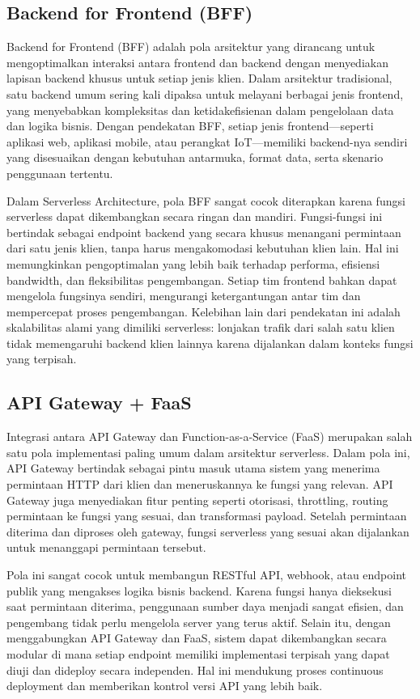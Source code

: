 \subsection{Backend for Frontend (BFF)}

Backend for Frontend (BFF) adalah pola arsitektur yang dirancang untuk mengoptimalkan interaksi antara frontend dan backend dengan menyediakan lapisan backend khusus untuk setiap jenis klien. Dalam arsitektur tradisional, satu backend umum sering kali dipaksa untuk melayani berbagai jenis frontend, yang menyebabkan kompleksitas dan ketidakefisienan dalam pengelolaan data dan logika bisnis. Dengan pendekatan BFF, setiap jenis frontend—seperti aplikasi web, aplikasi mobile, atau perangkat IoT—memiliki backend-nya sendiri yang disesuaikan dengan kebutuhan antarmuka, format data, serta skenario penggunaan tertentu.

Dalam Serverless Architecture, pola BFF sangat cocok diterapkan karena fungsi serverless dapat dikembangkan secara ringan dan mandiri. Fungsi-fungsi ini bertindak sebagai endpoint backend yang secara khusus menangani permintaan dari satu jenis klien, tanpa harus mengakomodasi kebutuhan klien lain. Hal ini memungkinkan pengoptimalan yang lebih baik terhadap performa, efisiensi bandwidth, dan fleksibilitas pengembangan. Setiap tim frontend bahkan dapat mengelola fungsinya sendiri, mengurangi ketergantungan antar tim dan mempercepat proses pengembangan. Kelebihan lain dari pendekatan ini adalah skalabilitas alami yang dimiliki serverless: lonjakan trafik dari salah satu klien tidak memengaruhi backend klien lainnya karena dijalankan dalam konteks fungsi yang terpisah.

\subsection{API Gateway + FaaS}

Integrasi antara API Gateway dan Function-as-a-Service (FaaS) merupakan salah satu pola implementasi paling umum dalam arsitektur serverless. Dalam pola ini, API Gateway bertindak sebagai pintu masuk utama sistem yang menerima permintaan HTTP dari klien dan meneruskannya ke fungsi yang relevan. API Gateway juga menyediakan fitur penting seperti otorisasi, throttling, routing permintaan ke fungsi yang sesuai, dan transformasi payload. Setelah permintaan diterima dan diproses oleh gateway, fungsi serverless yang sesuai akan dijalankan untuk menanggapi permintaan tersebut.

Pola ini sangat cocok untuk membangun RESTful API, webhook, atau endpoint publik yang mengakses logika bisnis backend. Karena fungsi hanya dieksekusi saat permintaan diterima, penggunaan sumber daya menjadi sangat efisien, dan pengembang tidak perlu mengelola server yang terus aktif. Selain itu, dengan menggabungkan API Gateway dan FaaS, sistem dapat dikembangkan secara modular di mana setiap endpoint memiliki implementasi terpisah yang dapat diuji dan dideploy secara independen. Hal ini mendukung proses continuous deployment dan memberikan kontrol versi API yang lebih baik.

